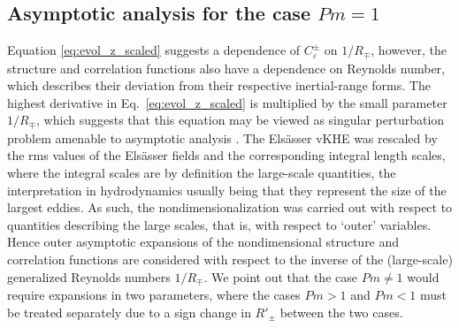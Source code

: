 \documentclass[aps,pre,onecolumn,superscriptaddress,notitlepage]{revtex4-1}
\newcommand{\Ceps}{C_\varepsilon}
\begin{document}
\subsection{Asymptotic analysis for the case $Pm=1$} 
Equation \eqref{eq:evol_z_scaled} suggests a dependence of $\Ceps^\pm$ on $1/R_{\mp}$, 
however, the structure and correlation functions also have a dependence on
Reynolds number, which describes their deviation from their respective inertial-range forms. 
The highest derivative in Eq.~\eqref{eq:evol_z_scaled} is multiplied by the 
small parameter $1/R_\mp$, which suggests
that this equation may be viewed as singular perturbation problem amenable 
to asymptotic analysis \cite{Lundgren02}. 
The Els\"asser vKHE was rescaled by 
the rms values of the Els\"asser fields and the corresponding integral length scales, where
the integral scales are by definition the large-scale quantities, 
the interpretation in hydrodynamics usually being that they 
represent the size of the largest eddies.  
As such, the nondimensionalization was carried out with respect 
to quantities describing the large scales, that is,
with respect to `outer' variables. Hence outer asymptotic 
expansions of the nondimensional structure and correlation functions are 
considered with respect
to the inverse of the (large-scale) generalized Reynolds numbers $1/R_{\mp}$. 
We point out that 
the case $Pm \neq 1$ would require expansions in two parameters, 
where the cases $Pm >1$ and $Pm <1$ must be treated separately due to a sign change in $R'_\pm$
between the two cases. 
    
\end{document}

